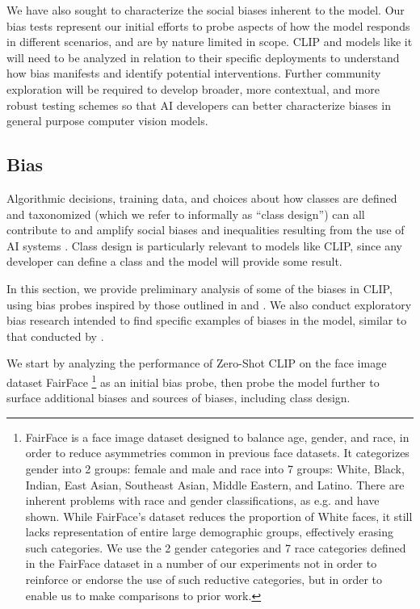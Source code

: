 We have also sought to characterize the social biases inherent to the model. Our bias tests represent our initial efforts to probe aspects of how the model responds in different scenarios, and are by nature limited in scope. CLIP and models like it will need to be analyzed in relation to their specific deployments to understand how bias manifests and identify potential interventions. Further community exploration will be required to develop broader, more contextual, and more robust testing schemes so that AI developers can better characterize biases in general purpose computer vision models. 

\subsection{Bias}
Algorithmic decisions, training data, and choices about how classes are defined and taxonomized (which we refer to informally as ``class design'') can all contribute to and amplify social biases and inequalities resulting from the use of  AI systems \citep{Noble2018, Bechmann2019, bowker2000sorting}. Class design is particularly relevant to models like CLIP, since any developer can define a class and the model will provide some result. 

In this section, we provide preliminary analysis of some of the biases in CLIP, using bias probes inspired by those outlined in \citet{buolamwini2018gendershades} and \citet{1908.04913}. We also conduct exploratory bias research intended to find specific examples of biases in the model, similar to that conducted by \citet{1908.09203}. 

We start by analyzing the performance of Zero-Shot CLIP on the face image dataset FairFace \citep{1908.04913}\footnote{FairFace is a face image dataset designed to balance age, gender, and race, in order to reduce asymmetries common in previous face datasets. It categorizes gender into 2 groups: female and male and race into 7 groups: White, Black, Indian, East Asian, Southeast Asian, Middle Eastern, and Latino. There are inherent problems with race and gender classifications, as e.g. \citet{bowker2000sorting} and \citet{keyes2018misgendering} have shown. While FairFace’s dataset reduces the proportion of White faces, it still lacks representation of entire large demographic groups, effectively erasing such categories. We use the 2 gender categories and 7 race categories defined in the FairFace dataset in a number of our experiments not in order to reinforce or endorse the use of such reductive categories, but in order to enable us to make comparisons to prior work.} as an initial bias probe, then probe the model further to surface additional biases and sources of biases, including class design.


